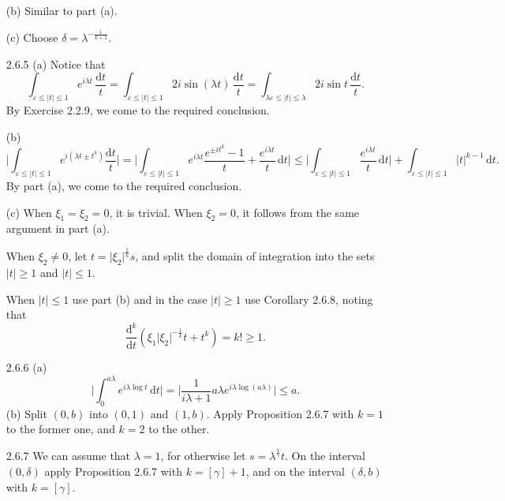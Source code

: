 \begin{itemize}
(b) Similar to part (a).

(c) Choose $\delta =\lambda^{-\frac1{k+1}}$.\\

\item[2.6.5]
(a) Notice that
$$\int _{\varepsilon\leq \vert t\vert \leq 1} e^{i\lambda t}\,\frac{\mathrm{d}t}{t}
=\int _{\varepsilon\leq \vert t\vert \leq 1} 2i\sin(\lambda t)\,\frac{\mathrm{d}t}{t}=
\int _{\lambda\varepsilon\leq \vert t\vert \leq \lambda} 2i\sin t\,\frac{\mathrm{d}t}{t}.$$
By Exercise 2.2.9, we come to the required conclusion.

(b) $$\bigg| \int _{\varepsilon\leq \vert t\vert \leq 1} e^{i(\lambda t\pm t^k)}\frac{\mathrm{d}t}{t}\bigg| 
=\bigg| \int _{\varepsilon\leq \vert t\vert \leq 1}e^{i\lambda t}\frac{e^{\pm it^k}-1}{t}+\frac{e^{i\lambda t}}{t}\,\mathrm{d}t\bigg| 
\leq \bigg| \int _{\varepsilon\leq \vert t\vert \leq 1}\frac{e^{i\lambda t }}{t}\,\mathrm{d}t\bigg| 
+\int_{\varepsilon\leq \vert t\vert \leq 1}\vert t\vert ^{k-1}\,\mathrm{d}t.$$
By part (a), we come to the required conclusion.

(c) When $\xi_1=\xi_2=0$, it is trivial. 
When $\xi_2=0$, it follows from the same argument in part (a).

When $\xi_2\neq 0$, let $t = \vert \xi_2\vert^{\frac1k}s$, 
and split the domain of integration into 
the sets $\vert t\vert  ≥ 1$ and $\vert t\vert  ≤ 1$.

When $\vert t\vert  ≤ 1$ use part (b) and
in the case $\vert t\vert  \geq 1$ use Corollary 2.6.8, noting that 
$$\frac{\mathrm{d}^k}{\mathrm{d}t}(\xi_1\vert \xi_2\vert ^{-\frac1k}t+t^k)= k!≥1.$$

\item[2.6.6]
(a) $$\bigg\vert \int_0^{a\lambda}e^{i\lambda \log t}\,\mathrm{d}t\bigg\vert 
=\bigg\vert \frac1{i\lambda+1}a\lambda e^{i\lambda\log (a\lambda)}\bigg\vert \leq a .$$
(b) Split $(0,b)$ into $(0,1) $ and $(1,b)$. 
Apply Proposition 2.6.7 with $k=1$ to the former one, and $k=2$ to the other.

\item[2.6.7]
We can assume that $\lambda =1$, for otherwise let $s=\lambda^{\frac1\gamma}t$.
On the interval $(0,δ)$ apply Proposition 2.6.7 with $k = [\gamma] + 1$, 
and on the interval $(\delta,b)$ with $k = [\gamma]$.

\end{itemize}